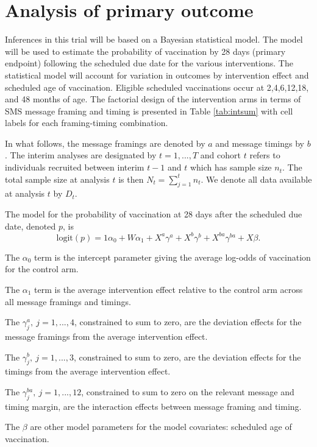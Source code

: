 \documentclass[
  bibliography=totoc]{scrreprt}
\begin{document}
\hypertarget{analysis-of-primary-outcome}{%
\section{Analysis of primary outcome}\label{analysis-of-primary-outcome}}

Inferences in this trial will be based on a Bayesian statistical model.
The model will be used to estimate the probability of vaccination by 28 days (primary endpoint) following the scheduled due date for the various interventions.
The statistical model will account for variation in outcomes by intervention effect and scheduled age of vaccination.
Eligible scheduled vaccinations occur at 2,4,6,12,18, and 48 months of age.
The factorial design of the intervention arms in terms of SMS message framing and timing is presented in Table \ref{tab:intsum} with cell labels for each framing-timing combination.

In what follows, the message framings are denoted by \(a\) and message timings by \(b\).
The interim analyses are designated by \(t=1,...,T\) and cohort \(t\) refers to individuals recruited between interim \(t-1\) and \(t\) which has sample size \(n_t\).
The total sample size at analysis \(t\) is then \(N_t = \sum_{j=1}^t n_t\).
We denote all data available at analysis \(t\) by \(D_t\).

The model for the probability of vaccination at 28 days after the scheduled due date, denoted \(p\), is
\[
\text{logit}(p) = 1\alpha_0 + W\alpha_1 + X^a\gamma^a + X^b\gamma^b + X^{ba}\gamma^{ba} + X\beta.
\]

The \(\alpha_0\) term is the intercept parameter giving the average log-odds of vaccination for the control arm.

The \(\alpha_1\) term is the average intervention effect relative to the control arm across all message framings and timings.

The \(\gamma^a_j,\ j=1,...,4\), constrained to sum to zero, are the deviation effects for the message framings from the average intervention effect.

The \(\gamma^b_j,\ j=1,...,3\), constrained to sum to zero, are the deviation effects for the timings from the average intervention effect.

The \(\gamma^{ba}_j,\ j=1,...,12\), constrained to sum to zero on the relevant message and timing margin, are the interaction effects between message framing and timing.

The \(\beta\) are other model parameters for the model covariates: scheduled age of vaccination.
\end{document}
